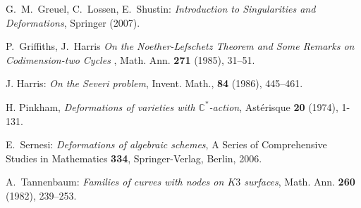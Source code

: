 \documentclass[plain]{amsart}
\begin{document}
\begin{thebibliography}{111}
 G.~M.~Greuel, C.~Lossen, E.~Shustin: {\em Introduction to Singularities and 
Deformations}, Springer (2007).

 P.~Griffiths, J.~Harris {\it On the Noether-Lefschetz Theorem 
and Some Remarks on Codimension-two Cycles }, 
Math. Ann. {\bf 271} (1985), 31--51.

 J. Harris: {\em On the Severi problem}, Invent. Math.,
{\bf 84} (1986), 445--461.


 H. Pinkham, {\em Deformations of varieties with $\mathbb C^*$-action}, Ast\'erisque
{\bf 20} (1974), 1-131.

 E.~Sernesi: {\em Deformations of algebraic schemes},  
A Series of Comprehensive Studies in Mathematics {\bf 334}, Springer-Verlag, Berlin, 2006.

 A.~Tannenbaum: {\em Families of curves with nodes on $K3$ surfaces},
Math. Ann. {\bf 260} (1982), 239--253.





\end{thebibliography}{}
\end{document}
